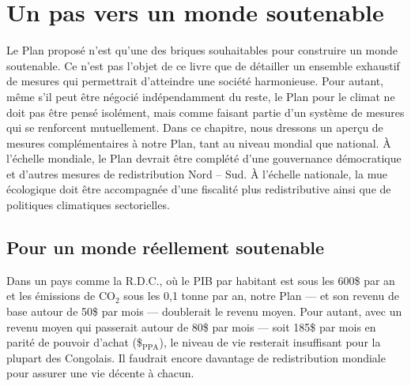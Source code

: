 \documentclass[a5paper,french]{memoir}
\begin{document}
\chapter{Un pas vers un monde soutenable\label{ch:premier_pas}} %

Le Plan proposé n'est qu'une des briques souhaitables pour construire un monde soutenable. Ce n'est pas l'objet de ce livre que de détailler un ensemble exhaustif de mesures qui permettrait d'atteindre une société harmonieuse. Pour autant, même s'il peut être négocié indépendamment du reste, le Plan pour le climat ne doit pas être pensé isolément, mais comme faisant partie d'un système de mesures qui se renforcent mutuellement. Dans ce chapitre, nous dressons un aperçu de mesures complémentaires à notre Plan, tant au niveau mondial que national. À l'échelle mondiale, le Plan devrait être complété d'une gouvernance démocratique et d'autres mesures de redistribution Nord -- Sud. À l'échelle nationale, la mue écologique doit être accompagnée d'une fiscalité plus redistributive ainsi que de politiques climatiques sectorielles. 

\section{Pour un monde réellement soutenable}

Dans un pays comme la R.D.C., où le PIB par habitant est sous les 600\$ par an et les émissions de CO$_\text{2}$ sous les 0,1 tonne par an, notre Plan --- et son revenu de base autour de 50\$ par mois --- doublerait le revenu moyen. %
Pour autant, avec un revenu moyen qui passerait autour de 80\$ par mois --- soit 185\$ par mois en parité de pouvoir d'achat (\$$_\text{PPA}$), le niveau de vie resterait insuffisant pour la plupart des Congolais. Il faudrait encore davantage de redistribution mondiale pour assurer une vie décente à chacun. 
\end{document}
